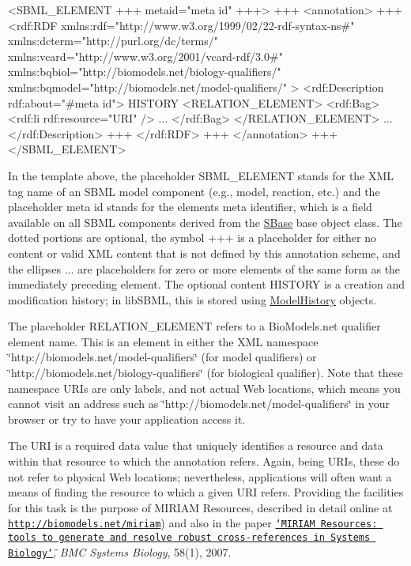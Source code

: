 \begin{DoxyPre}
<SBML\_ELEMENT +++ metaid="meta id" +++>
  +++
  <annotation>
    +++
    <rdf:RDF xmlns:rdf="http://www.w3.org/1999/02/22-rdf-syntax-ns#"
             xmlns:dcterm="http://purl.org/dc/terms/"
             xmlns:vcard="http://www.w3.org/2001/vcard-rdf/3.0#"
             xmlns:bqbiol="http://biomodels.net/biology-qualifiers/"
             xmlns:bqmodel="http://biomodels.net/model-qualifiers/" >
      <rdf:Description rdf:about="\#meta id">
        HISTORY
        <RELATION\_ELEMENT>
          <rdf:Bag>
            <rdf:li rdf:resource="URI" />
            ...
          </rdf:Bag>
        </RELATION\_ELEMENT>
        ...
      </rdf:Description>
      +++
    </rdf:RDF>
    +++
  </annotation>
  +++
</SBML\_ELEMENT>
\end{DoxyPre}


In the template above, the placeholder S\+B\+M\+L\+\_\+\+E\+L\+E\+M\+E\+NT stands for the X\+ML tag name of an S\+B\+ML model component (e.\+g., {\ttfamily model}, {\ttfamily reaction}, etc.) and the placeholder meta id stands for the element\textquotesingle{}s meta identifier, which is a field available on all S\+B\+ML components derived from the \hyperlink{class_s_base}{S\+Base} base object class. The dotted portions are optional, the symbol +++ is a placeholder for either no content or valid X\+ML content that is not defined by this annotation scheme, and the ellipses ... are placeholders for zero or more elements of the same form as the immediately preceding element. The optional content H\+I\+S\+T\+O\+RY is a creation and modification history; in lib\+S\+B\+ML, this is stored using \hyperlink{class_model_history}{Model\+History} objects.

The placeholder R\+E\+L\+A\+T\+I\+O\+N\+\_\+\+E\+L\+E\+M\+E\+NT refers to a Bio\+Models.\+net qualifier element name. This is an element in either the X\+ML namespace {\ttfamily \char`\"{}http\+://biomodels.\+net/model-\/qualifiers\char`\"{}} (for model qualifiers) or {\ttfamily \char`\"{}http\+://biomodels.\+net/biology-\/qualifiers\char`\"{}} (for biological qualifier). Note that these namespace U\+R\+Is are only labels, and not actual Web locations, which means you cannot visit an address such as {\ttfamily \char`\"{}http\+://biomodels.\+net/model-\/qualifiers\char`\"{}} in your browser or try to have your application access it.

The U\+RI is a required data value that uniquely identifies a resource and data within that resource to which the annotation refers. Again, being U\+R\+Is, these do not refer to physical Web locations; nevertheless, applications will often want a means of finding the resource to which a given U\+RI refers. Providing the facilities for this task is the purpose of M\+I\+R\+I\+AM Resources, described in detail online at \href{http://biomodels.net/miriam}{\tt http\+://biomodels.\+net/miriam}) and also in the paper \href{http://www.biomedcentral.com/1752-0509/1/58}{\tt \char`\"{}\+M\+I\+R\+I\+A\+M Resources\+: tools to generate and
  resolve robust cross-\/references in Systems Biology\char`\"{}}, {\itshape B\+MC Systems Biology}, 58(1), 2007.

